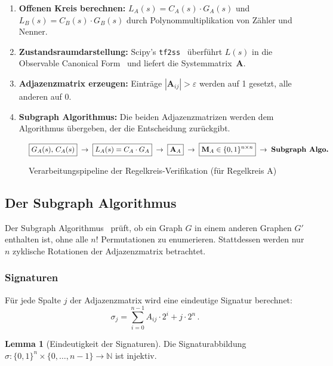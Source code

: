 \documentclass[a4paper,12pt]{article}
\theoremstyle{definition}
\newtheorem{lemma}{Lemma}
\begin{document}
\begin{enumerate}
    \item \textbf{Offenen Kreis berechnen:} $L_A(s) = C_A(s) \cdot G_A(s)$
          und $L_B(s) = C_B(s) \cdot G_B(s)$ durch Polynommultiplikation
          von Zähler und Nenner.

    \item \textbf{Zustandsraumdarstellung:} Scipy's \texttt{tf2ss}~\cite{scipy} überführt
          $L(s)$ in die Observable Canonical Form~\cite{ogata} und liefert die
          Systemmatrix~$\mathbf{A}$.

    \item \textbf{Adjazenzmatrix erzeugen:} Einträge $|\mathbf{A}_{ij}| > \varepsilon$
          werden auf 1 gesetzt, alle anderen auf 0.

    \item \textbf{Subgraph Algorithmus:} Die beiden Adjazenzmatrizen werden
          dem Algorithmus übergeben, der die Entscheidung zurückgibt.
\end{enumerate}

\begin{figure}[h]
\centering
\small
\[
\boxed{G_A(s),\,C_A(s)}
\;\rightarrow\;
\boxed{L_A(s) = C_A \cdot G_A}
\;\rightarrow\;
\boxed{\mathbf{A}_A}
\;\rightarrow\;
\boxed{\mathbf{M}_A \in \{0,1\}^{n \times n}}
\;\rightarrow\;
\text{\textbf{Subgraph Algo.}}
\]
\caption{Verarbeitungspipeline der Regelkreis-Verifikation (für Regelkreis A)}
\label{fig:pipeline}
\end{figure}

\subsection{Der Subgraph Algorithmus}

Der Subgraph Algorithmus~\cite{subgraph} prüft, ob ein Graph $G$ in einem
anderen Graphen $G'$ enthalten ist, ohne alle $n!$ Permutationen zu
enumerie\-ren. Stattdessen werden nur $n$ zyklische Rotationen der
Adjazenzmatrix betrachtet.

\subsubsection{Signaturen}

Für jede Spalte $j$ der Adjazenzmatrix wird eine eindeutige Signatur berechnet:
\[
\sigma_j = \sum_{i=0}^{n-1} A_{ij} \cdot 2^i + j \cdot 2^n \,.
\]

\begin{lemma}[Eindeutigkeit der Signaturen]
Die Signaturabbildung $\sigma: \{0,1\}^n \times \{0,\ldots,n-1\} \to \mathbb{N}$
ist injektiv.
\end{lemma}
\end{document}
